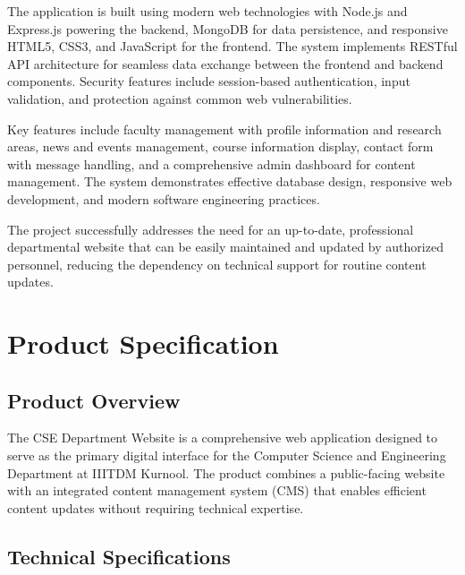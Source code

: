 \documentclass[12pt,a4paper]{report}
\begin{document}
The application is built using modern web technologies with Node.js and Express.js powering the backend, MongoDB for data persistence, and responsive HTML5, CSS3, and JavaScript for the frontend. The system implements RESTful API architecture for seamless data exchange between the frontend and backend components. Security features include session-based authentication, input validation, and protection against common web vulnerabilities.

Key features include faculty management with profile information and research areas, news and events management, course information display, contact form with message handling, and a comprehensive admin dashboard for content management. The system demonstrates effective database design, responsive web development, and modern software engineering practices.

The project successfully addresses the need for an up-to-date, professional departmental website that can be easily maintained and updated by authorized personnel, reducing the dependency on technical support for routine content updates.

\tableofcontents
{}

\listoffigures
{}

\listoftables
{}

\chapter{Product Specification}
\label{chap:product_spec}

\section{Product Overview}
The CSE Department Website is a comprehensive web application designed to serve as the primary digital interface for the Computer Science and Engineering Department at IIITDM Kurnool. The product combines a public-facing website with an integrated content management system (CMS) that enables efficient content updates without requiring technical expertise.

\section{Technical Specifications}
\end{document}
